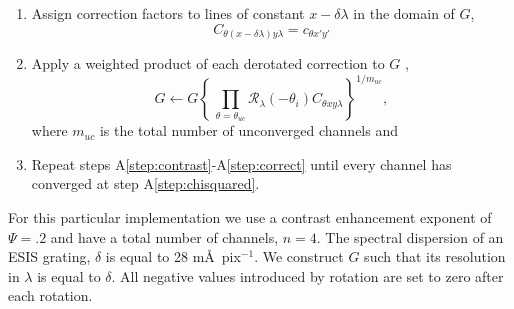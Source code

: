 \begin{enumerate}
		\item Assign correction factors to lines of constant $x-\delta\lambda$ in the domain of $G$,
			\begin{equation}
				C_{\theta (x-\delta\lambda)y\lambda} = c_{\theta x'y'}
			\end{equation}	
		
		\item \label{step:correct} Apply a weighted product of each derotated correction to $G$ ,
			\begin{equation}\label{eq:correct}
				G \leftarrow G\left\lbrace  \,\prod_{\theta=\theta_{uc}}  \mathcal{R}_\lambda(-\theta_i)C_{\theta xy\lambda} \right\rbrace^{1/m_{uc}},
			\end{equation}
		where $m_{uc}$ is the total number of unconverged channels and 
		
		\item Repeat steps A\ref{step:contrast}-A\ref{step:correct}
		until every channel has converged at step A\ref{step:chisquared}.
	\end{enumerate}
		For this particular implementation we use a contrast enhancement exponent of $\Psi = .2$ and have a total number of channels, $n=4$.
		The spectral dispersion of an ESIS grating, $\delta$ is equal to 28 m\AA\ pix$^{-1}$. 
		We construct $G$ such that its resolution  in $\lambda$ is equal to $\delta$.
		All negative values introduced by rotation are set to zero after each rotation.

